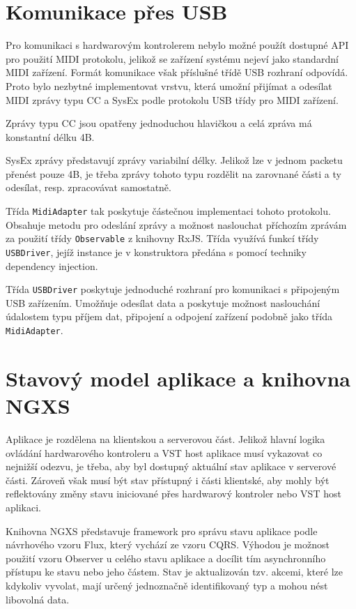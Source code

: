 \documentclass[thesis=M,czech]{FITthesis}[2019/03/06]
\begin{document}
	\section{Komunikace přes USB}
		Pro komunikaci s hardwarovým kontrolerem nebylo možné použít dostupné API pro použití MIDI protokolu,
		jelikož se zařízení systému nejeví jako standardní MIDI zařízení. Formát komunikace však příslušné třídě USB rozhraní odpovídá.
		Proto bylo nezbytné implementovat vrstvu, která umožní přijímat a odesílat MIDI zprávy typu CC a SysEx
		podle protokolu USB třídy pro MIDI zařízení\cite{usbmidi}.
		
		Zprávy typu CC jsou opatřeny jednoduchou hlavičkou a celá zpráva má konstantní délku 4B.
		
		SysEx zprávy představují zprávy variabilní délky. Jelikož lze v jednom packetu přenést pouze 4B,
		je třeba zprávy tohoto typu rozdělit na zarovnané části a ty odesílat, resp. zpracovávat samostatně.
		
		Třída \texttt{MidiAdapter} tak poskytuje částečnou implementaci tohoto protokolu. 
		Obsahuje metodu pro odeslání zprávy a možnost naslouchat příchozím zprávám za použití třídy \texttt{Observable} z knihovny RxJS.		
		Třída využívá funkcí třídy \texttt{USBDriver}, jejíž instance je v konstruktora předána s pomocí techniky dependency injection\cite{prasanna2009dependency}.
		
		Třída \texttt{USBDriver} poskytuje jednoduché rozhraní pro komunikaci s připojeným USB zařízením.
		Umožňuje odesílat data a poskytuje možnost naslouchání údalostem typu příjem dat, připojení a odpojení zařízení podobně jako třída \texttt{MidiAdapter}.

	\section{Stavový model aplikace a knihovna NGXS}\label{sec:NGXS}
		Aplikace je rozdělena na klientskou a serverovou část. Jelikož hlavní logika ovládání hardwarového kontroleru a VST host aplikace
		musí vykazovat co nejnižší odezvu, je třeba, aby byl dostupný aktuální stav aplikace v serverové části.
		Zároveň však musí být stav přístupný i části klientské, aby mohly být reflektovány změny stavu iniciované přes
		hardwarový kontroler nebo VST host aplikaci.

		Knihovna NGXS představuje framework pro správu stavu aplikace podle návrhového vzoru Flux\cite{flux}, který vychází ze vzoru CQRS\cite{flux-cqrs}. Výhodou je možnost použití vzoru Observer u celého stavu aplikace a docílit tím asynchronního
		přístupu ke stavu nebo jeho částem\cite{mansilla2018reactive}. Stav je aktualizován tzv. akcemi, které lze kdykoliv vyvolat,
		mají určený jednoznačně identifikovaný typ a mohou nést libovolná data.
		
\end{document}
